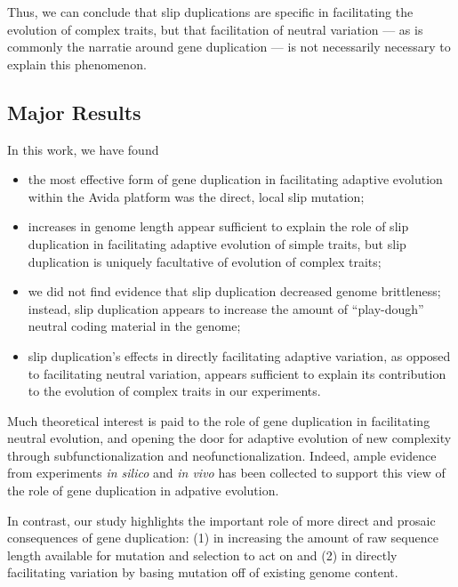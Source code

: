 Thus, we can conclude that slip duplications are specific in facilitating the evolution of complex traits, but that facilitation of neutral variation --- as is commonly the narratie around gene duplication --- is not necessarily necessary to explain this phenomenon.

\subsection{Major Results}

In this work, we have found
\begin{itemize}
\item the most effective form of gene duplication in facilitating adaptive evolution within the Avida platform was the direct, local slip mutation;
\item increases in genome length appear sufficient to explain the role of slip duplication in facilitating adaptive evolution of simple traits, but slip duplication is uniquely facultative of evolution of complex traits;
\item we did not find evidence that slip duplication decreased genome brittleness; instead, slip duplication appears to increase the amount of ``play-dough'' neutral coding material in the genome;
\item slip duplication's effects in directly facilitating adaptive variation, as opposed to facilitating neutral variation, appears sufficient to explain its contribution to the evolution of complex traits in our experiments.
\end{itemize}

Much theoretical interest is paid to the role of gene duplication in facilitating neutral evolution, and opening the door for adaptive evolution of new complexity through subfunctionalization and neofunctionalization.
Indeed, ample evidence from experiments \textit{in silico} and \textit{in vivo} has been collected to support this view of the role of gene duplication in adpative evolution.

In contrast, our study highlights the important role of more direct and prosaic consequences of gene duplication: (1) in increasing the amount of raw sequence length available for mutation and selection to act on and (2) in directly facilitating variation by basing mutation off of existing genome content.


